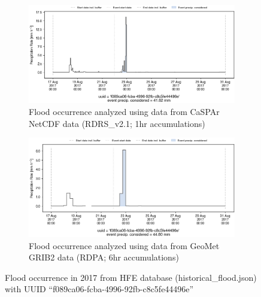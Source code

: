 \documentclass[10pt,a4paper,titlepage,parskip]{scrartcl}
\begin{document}
\begin{figure}[h]
	\begin{subfigure}[a]{1.0\textwidth}
		\centering
		\includegraphics[width=\linewidth]{figures/compare_Geomet_CaSPAr/interpolated_at_stations_occurrence_1478_identified-timesteps_RDRS_v2.1.png}
		\caption{Flood occurrence analyzed using data from CaSPAr NetCDF data (RDRS\_v2.1; 1hr accumulations)}
	\end{subfigure}
	\par\bigskip\bigskip
	\begin{subfigure}[b]{1.0\textwidth}
		\centering
		\includegraphics[width=\linewidth]{figures/compare_Geomet_CaSPAr/interpolated_at_stations_occurrence_1478_identified-timesteps_rdpa_10km_6f.png}
		\caption{Flood occurrence analyzed using data from GeoMet GRIB2 data (RDPA; 6hr accumulations)}
	\end{subfigure}
	\par\bigskip\bigskip
	\caption{Flood occurrence in 2017 from HFE database (historical\_flood.json) with UUID ``f089ca06-fcba-4996-92fb-c8c5fe44496e''}
\end{figure}
\pagebreak
\end{document}
